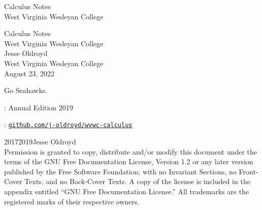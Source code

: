 \documentclass[twoside,10pt,]{tufte-book}
\newcommand{\titlepagefont}{\relax}
\newcommand{\mono}[1]{\texttt{#1}}
\numberwithin{equation}{part}
\begin{document}
\raggedbottom
\frontmatter
\thispagestyle{empty}
{\titlepagefont\centering
\vspace*{0.28\textheight}
{\Huge Calculus Notes}\\[2\baselineskip]
{\LARGE West Virginia Wesleyan College}\\
}
\clearpage
\thispagestyle{empty}
\null%
\clearpage
\thispagestyle{empty}
{\titlepagefont\centering
\vspace*{0.14\textheight}
{\Huge Calculus Notes}\\[\baselineskip]
{\LARGE West Virginia Wesleyan College}\\[3\baselineskip]
{\Large Jesse Oldroyd}\\[0.5\baselineskip]
{\Large West Virginia Wesleyan College}\\[3\baselineskip]
{\Large August 23, 2022}\\}
\clearpage
\thispagestyle{empty}
\hypertarget{x:colophon:front-colophon}{}\noindent
Go Seahawks.%
\par
{}
: Annual Edition 2019\par\medskip
{}: \href{https:\slash{}\slash{}github.com\slash{}j-oldroyd\slash{}wvwc-calculus}{\mono{github.com/j-oldroyd/wvwc-calculus}}\par\medskip
\noindent\textcopyright{}2017\textendash{}2019\quad{}Jesse Oldroyd\\[0.5\baselineskip]
Permission is granted to copy, distribute and\slash{}or modify this document under the terms of the GNU Free Documentation License, Version 1.2 or any later version published by the Free Software Foundation; with no Invariant Sections, no Front-Cover Texts, and no Back-Cover Texts.  A copy of the license is included in the appendix entitled ``GNU Free Documentation License.''  All trademarks\texttrademark{} are the registered\textregistered{} marks of their respective owners.\par\medskip
{}
\null\clearpage
%
%
\typeout{************************************************}
\end{document}
